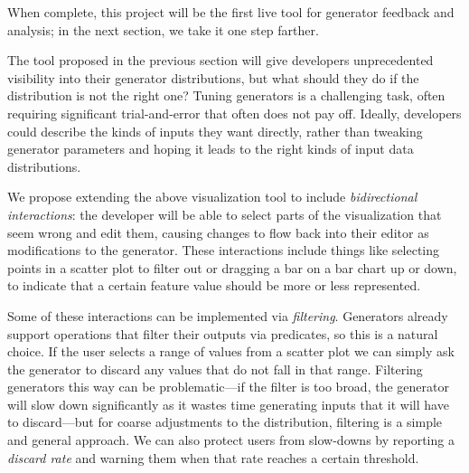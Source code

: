 When complete, this project will be the first live tool for generator
feedback and analysis; in the next section, we take it one step farther.



The tool proposed in the previous section will give developers unprecedented
visibility into their generator distributions, but what should they do if the
distribution is not the right one? Tuning generators is a challenging task,
often requiring significant trial-and-error that often does not pay off.
Ideally, developers could describe the kinds of inputs they want directly,
rather than tweaking generator parameters and hoping it leads to the right kinds
of input data distributions.

We propose extending the above visualization tool to include {\em bidirectional
interactions}: the developer will be able to select parts of the visualization
that seem wrong and edit them, causing changes to flow back into their editor as
modifications to the generator. These interactions include things like
selecting points in a scatter plot to filter out or dragging a bar on a bar
chart up or down, to indicate that a certain feature value should be more or
less represented.

Some of these interactions can be implemented via {\em filtering}. Generators
already support operations that filter their outputs via predicates, so this is
a natural choice. If the user selects a range of values from a scatter plot we
can simply ask the generator to discard any values that do not fall in that
range.  Filtering generators this way can be problematic---if the filter is too
broad, the generator will slow down significantly as it wastes time generating
inputs that it will have to discard---but for coarse adjustments to the
distribution, filtering is a simple and general approach.  We can also protect
users from slow-downs by reporting a {\em discard rate} and warning them when
that rate reaches a certain threshold.

